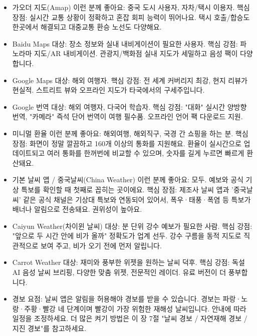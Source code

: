 \begin{itemize}
  \item 가오더 지도(Amap) 이런 분께 좋아요: 중국 도시 사용자, 자차/택시 이용자. 핵심 장점: 실시간 교통 상황이 정확하고 혼잡 회피 능력이 뛰어나요. 택시 호출/합승도 한곳에서 해결되고 대중교통 환승 노선도 다양해요.
  \item Baidu Maps 대상: 장소 정보와 실내 내비게이션이 필요한 사용자. 핵심 강점: 파노라마 지도/AR 내비게이션. 관광지/백화점 실내 지도가 세밀하고 음성 팩이 다양합니다.
  \item Google Maps 대상: 해외 여행자. 핵심 강점: 전 세계 커버리지 최강, 현지 리뷰가 현실적. 스트리트 뷰와 오프라인 지도가 타국에서의 구세주입니다.
\end{itemize}


\begin{itemize}
  \item Google 번역 대상: 해외 여행자, 다국어 학습자. 핵심 강점: "대화" 실시간 양방향 번역, "카메라" 즉석 단어 번역이 여행 필수품. 오프라인 언어 팩 다운로드 지원.
\end{itemize}


\begin{itemize}
  \item 미니멀 환율 이런 분께 좋아요: 해외여행, 해외직구, 국경 간 쇼핑을 하는 분. 핵심 장점: 화면이 정말 깔끔하고 160개 이상의 통화를 지원해요. 환율이 실시간으로 업데이트되고 여러 통화를 한꺼번에 비교할 수 있으며, 숫자를 길게 누르면 빠르게 환산돼요.
\end{itemize}


\begin{itemize}
  \item 기본 날씨 앱 / 중국날씨(China Weather) 이런 분께 좋아요: 모두. 예보와 공식 기상 특보를 확인할 때 첫째로 꼽히는 곳이에요. 핵심 장점: 제조사 날씨 앱과 '중국날씨' 같은 공식 채널은 기상대 특보와 연동되어 있어서, 폭우·태풍·폭염 등 특보가 배너나 알림으로 전송돼요. 권위성이 높아요.
  \item Caiyun Weather(차이윈 날씨) 대상: 분 단위 강수 예보가 필요한 사람. 핵심 강점: "앞으로 두 시간 안에 비가 올까" 정확도가 업계 선두. 강수 구름을 동적 지도로 직관적으로 보여 주고, 비가 오기 전에 먼저 알립니다.
  \item Carrot Weather 대상: 재미와 풍부한 위젯을 원하는 날씨 덕후. 핵심 강점: 독설 AI 음성 날씨 브리핑, 다양한 맞춤 위젯, 전문적인 레이더. 유료 버전이 더 풍부합니다.
  \item 경보 요점: 날씨 앱은 알림을 허용해야 경보를 받을 수 있습니다. 경보는 파랑·노랑·주황·빨강 네 단계이며 빨강이 가장 위험한 재해성 날씨입니다. 안내에 따라 일정을 조정하세요. 더 많은 켜기 방법은 이 장 7절 "날씨 경보 / 자연재해 경보 / 지진 경보"를 참고하세요.
\end{itemize}

